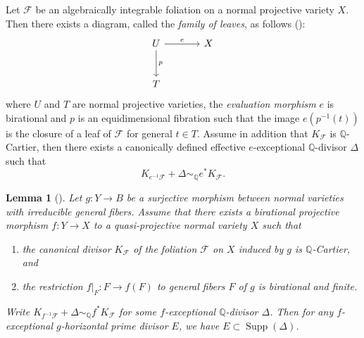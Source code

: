 \documentclass[12pt,twoside]{amsart}
\DeclareMathOperator{\Supp}{Supp}
\newtheorem{lem}[thm]{Lemma}
\theoremstyle{definition}
\begin{document}
Let $\mathcal{F}$ be an algebraically integrable foliation on a normal projective variety $X$. Then there exists a %
diagram, called the \emph{family of leaves}, as follows (\cite[\S\,3.6]{Druel2021}):
\begin{equation}
	\label{eq.familyofleaves}
	\begin{tikzcd}[row sep=large, column sep=large]
		U \arrow[r,"e"] \arrow[d,"p"]
		& X \\
		T
	\end{tikzcd}
\end{equation}
where $U$ and $T$ are normal projective varieties, the \emph{evaluation morphism} $e$ is birational and $p$ is an equidimensional fibration such that the image $e(p^{-1}(t))$ is the closure of a leaf of $\mathcal{F}$ for general $t\in T$. Assume in addition that $K_{\mathcal{F}}$ is $\mathbb{Q}$-Cartier, then there exists a canonically defined effective $e$-exceptional $\mathbb{Q}$-divisor $\Delta$ such that %
\begin{equation}
	\label{eq.PullBackKF}
	K_{e^{-1}\mathcal{F}} + \Delta \sim_{\mathbb{Q}} e^*K_{\mathcal{F}}.
\end{equation}

\begin{lem}[]
	\label{lem.Exc-div-family-leaves}
	Let $g\colon Y\rightarrow B$ be a surjective morphism between normal varieties with irreducible general fibers. Assume that there exists a birational projective morphism $f\colon Y\rightarrow X$ to a quasi-projective normal variety $X$ such that
	\begin{enumerate}
		\item the canonical divisor $K_{\mathcal{F}}$ of the foliation $\mathcal{F}$ on $X$ induced by $g$ is $\mathbb{Q}$-Cartier, and
		
		\item the restriction $f|_F\colon F \rightarrow f(F)$ to general fibers $F$ of $g$ is birational and finite.
	\end{enumerate}
 Write $K_{f^{-1}\mathcal{F}} + \Delta \sim_{\mathbb{Q}} f^*K_{\mathcal{F}}$ for some $f$-exceptional $\mathbb{Q}$-divisor $\Delta$. Then for any $f$-exceptional $g$-horizontal prime divisor $E$, we have $E\subset \Supp(\Delta)$.
\end{lem}
\end{document}
